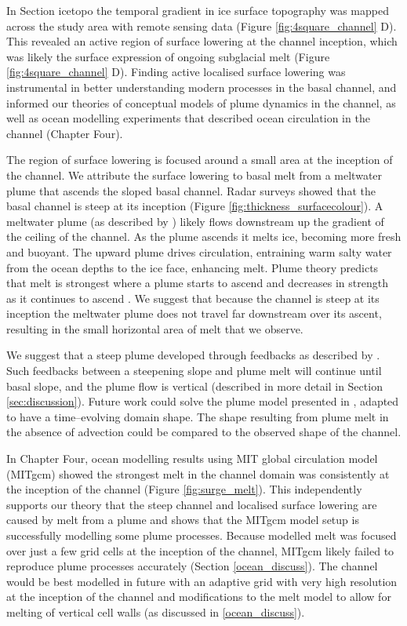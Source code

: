 In Section icetopo the temporal gradient in ice surface topography was mapped across the study area with remote sensing data (Figure \ref{fig:4square_channel} D). This revealed an active region of surface lowering at the channel inception, which was likely the surface expression of ongoing subglacial melt (Figure \ref{fig:4square_channel} D).  
Finding active localised surface lowering was instrumental in better understanding modern processes in the basal channel, and informed our theories of conceptual models of plume dynamics in the channel, as well as ocean modelling experiments that described ocean circulation in the channel (Chapter Four). 

The region of surface lowering is focused around a small area at the inception of the channel. We attribute the surface lowering to basal melt from a meltwater plume that ascends the sloped basal channel. Radar surveys showed that the basal channel is steep at its inception (Figure \ref{fig:thickness_surfacecolour}). A meltwater plume (as described by \cite{jenkins1991one}) likely flows downstream up the gradient of the ceiling of the channel. As the plume ascends it melts ice, becoming more fresh and buoyant. The upward plume drives circulation, entraining warm salty water from the ocean depths to the ice face, enhancing melt.  Plume theory predicts that melt is strongest where a plume starts to ascend and decreases in strength as it continues to ascend \citep{jenkins1991one}. We suggest that because the channel is steep at its inception the meltwater plume does not travel far downstream over its ascent, resulting in the small horizontal area of melt that we observe. 

We suggest that a steep plume developed through feedbacks as described by \cite{sergienko2013basal}. Such feedbacks between a steepening slope and plume melt will continue until basal slope, and the plume flow is vertical (described in more detail in Section \ref{sec:discussion}).    
Future work could solve the plume model presented in \cite{jenkins2011convection}, adapted to have a time--evolving domain shape. The shape resulting from plume melt in the absence of advection could be compared to the observed shape of the channel. 

In Chapter Four, ocean modelling results using MIT global circulation model (MITgcm) showed the strongest melt in the channel domain was consistently at the inception of the channel (Figure \ref{fig:surge_melt}). This independently supports our theory that the steep channel and localised surface lowering are caused by melt from a plume and shows that the MITgcm model setup is successfully modelling some plume processes.
Because modelled melt was focused over just a few grid cells at the inception of the channel,  MITgcm likely failed to reproduce plume processes accurately (Section \ref{ocean_discuss}). The channel would be best modelled in future with an adaptive grid with very high resolution at the inception of the channel and modifications to the melt model to allow for melting of vertical cell walls (as discussed in \ref{ocean_discuss}).

